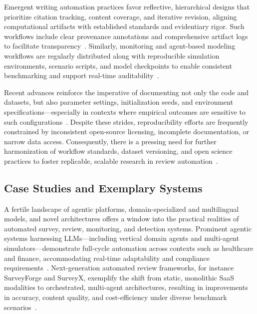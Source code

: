 Emergent writing automation practices favor reflective, hierarchical designs that prioritize citation tracking, content coverage, and iterative revision, aligning computational artifacts with established standards and evidentiary rigor. Such workflows include clear provenance annotations and comprehensive artifact logs to facilitate transparency~\cite{ref78,ref87,ref91,ref92,ref98,ref100,ref102,ref105,ref112,ref113,ref114,ref115}. Similarly, monitoring and agent-based modeling workflows are regularly distributed along with reproducible simulation environments, scenario scripts, and model checkpoints to enable consistent benchmarking and support real-time auditability~\cite{ref91,ref92,ref98,ref104,ref105,ref113,ref114,ref115}.

Recent advances reinforce the imperative of documenting not only the code and datasets, but also parameter settings, initialization seeds, and environment specifications—especially in contexts where empirical outcomes are sensitive to such configurations~\cite{ref92,ref100,ref112}. Despite these strides, reproducibility efforts are frequently constrained by inconsistent open-source licensing, incomplete documentation, or narrow data access. Consequently, there is a pressing need for further harmonization of workflow standards, dataset versioning, and open science practices to foster replicable, scalable research in review automation~\cite{ref113,ref114,ref115}.

\subsection{Case Studies and Exemplary Systems}

A fertile landscape of agentic platforms, domain-specialized and multilingual models, and novel architectures offers a window into the practical realities of automated survey, review, monitoring, and detection systems. Prominent agentic systems harnessing LLMs—including vertical domain agents and multi-agent simulators—demonstrate full-cycle automation across contexts such as healthcare and finance, accommodating real-time adaptability and compliance requirements~\cite{ref85,ref86,ref87,ref90,ref91,ref92,ref93,ref94,ref95}. Next-generation automated review frameworks, for instance SurveyForge and SurveyX, exemplify the shift from static, monolithic SaaS modalities to orchestrated, multi-agent architectures, resulting in improvements in accuracy, content quality, and cost-efficiency under diverse benchmark scenarios~\cite{ref87,ref98,ref99,ref100,ref104,ref105}.

